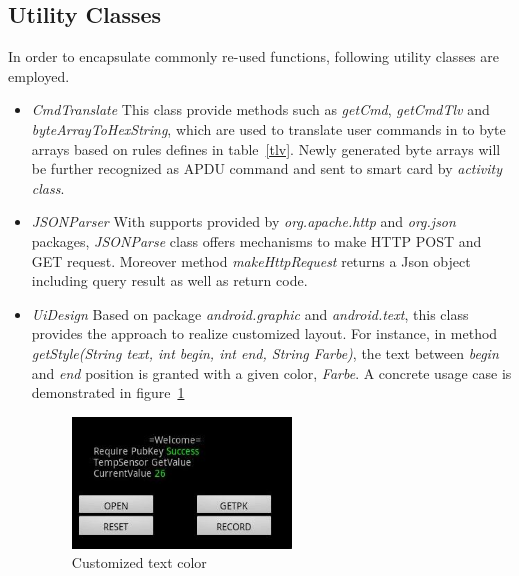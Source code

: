 \subsection{Utility Classes}
In order to encapsulate commonly re-used functions, following utility classes are employed.
\begin{itemize}
\item \emph{CmdTranslate} This class provide methods such as \emph{getCmd}, \emph{getCmdTlv} and \emph{byteArrayToHexString}, which are used to translate user commands in to byte arrays based on rules defines in table~\ref{tlv}. Newly generated byte arrays will be further recognized as APDU command and sent to smart card by \emph{activity class}.
\item \emph{JSONParser} With supports provided by \emph{org.apache.http} and \emph{org.json} packages, \emph{JSONParse} class offers mechanisms to make HTTP POST and GET request. Moreover method \emph{makeHttpRequest} returns a Json object including query result as well as return code.
\item \emph{UiDesign} Based on package \emph{android.graphic} and \emph{android.text}, this class provides the approach to realize customized layout. For instance, in method \emph{getStyle(String text, int begin, int end, String Farbe)}, the text between \emph{begin} and \emph{end} position is granted with a given color,  \emph{Farbe}. A concrete usage case is demonstrated in figure~\ref{fig:get-style}

\begin{figure}[!htbp]
	\centering
	\includegraphics[width=0.55\textwidth]{get-style.jpg}
		\caption{Customized text color}
	\label{fig:get-style}
\end{figure}

\end{itemize} 
